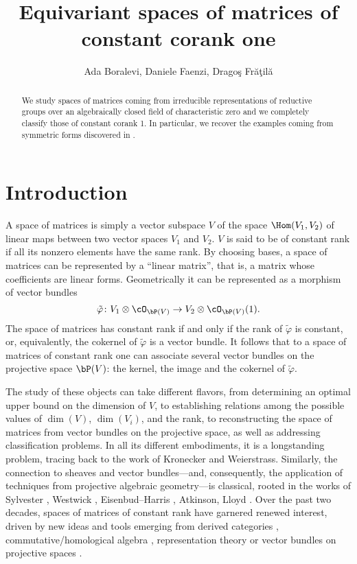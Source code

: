 \documentclass[reqno, 10pt]{amsart}
\title{Equivariant spaces of matrices of constant corank one}
\author{Ada Boralevi, Daniele Faenzi, Drago\c s Fr\u a\c til\u a}
\theoremstyle{plain}
\theoremstyle{definition}
\numberwithin{equation}{section}%
\begin{document}
	\maketitle
	\begin{abstract}
		We study spaces of matrices coming from irreducible representations of reductive groups over an algebraically closed field of characteristic zero and we completely classify those of constant corank 1.
		In particular, we recover the examples coming from symmetric forms discovered in \cite{BFL2}.
	\end{abstract}


\section{Introduction}


A space of matrices is simply a vector subspace $V$ of the space $\Hom(V_1,V_2)$ of linear maps between two vector spaces $V_1$ and $V_2$. $V$ is said to be of constant rank if all its nonzero elements have the same rank. 
By choosing bases, a space of matrices can be represented by a ``linear matrix'', that is, a matrix whose coefficients are linear forms.
Geometrically it can be represented as a morphism of vector bundles
\begin{equation}\label{eq:intro tildephi}
\tilde\varphi\colon V_1 \otimes \cO_{\bP(V)} \to V_2 \otimes \cO_{\bP(V)}(1).
\end{equation}
The space of matrices has constant rank if and only if the rank of $\tilde\varphi$ is constant, or, equivalently, the cokernel of $\tilde\varphi$ is a vector bundle.
It follows that to a space of matrices of constant rank one can associate several vector bundles on the projective space $\bP(V)$: the kernel, the image and the cokernel of $\tilde\varphi$.

\smallskip


The study of these objects can take different flavors, from
determining an optimal upper bound on the dimension of $V$, to
establishing relations among the possible values of $\dim(V)$,
$\dim(V_i)$, and the rank, to reconstructing the space of matrices
from vector bundles on the projective space, as well as addressing
classification problems. In all its different embodiments, it is a
longstanding problem, tracing back to the work of Kronecker and
Weierstrass. Similarly, the connection to sheaves and vector
bundles---and, consequently, the application of techniques from
projective algebraic geometry---is classical, rooted in the works of
Sylvester \cite{sylvester1986dimension}, Westwick
\cite{westwick-1,westwick-2}, Eisenbud--Harris
\cite{eisenbud1988vector}, Atkinson, Lloyd
\cite{atkinson1983primitive,atkinson-lloyd1981primitive}. Over the
past two decades, spaces of matrices of constant rank have garnered
renewed interest, driven by new ideas and tools emerging from derived
categories  \cite{BFM-instantons}, commutative/homological algebra
\cite{BFL-truncated, simone-rosa},  representation theory \cite{landsberg-manivel,BFL2} or vector bundles on projective spaces \cite{Manivel_Mezzetti,Manivel-Roig-vb}.
\end{document}
